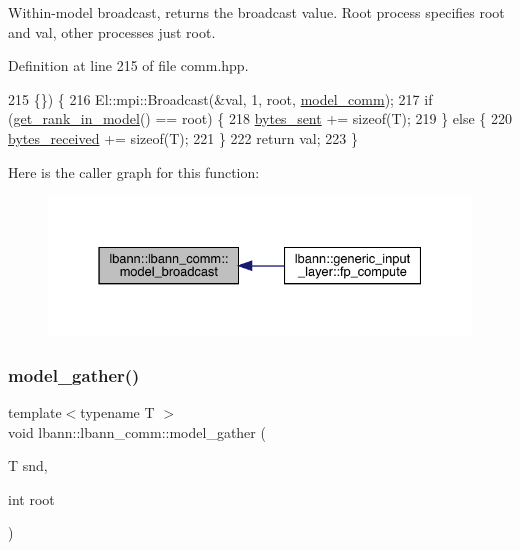 Within-\/model broadcast, returns the broadcast value. Root process specifies root and val, other processes just root. 

Definition at line 215 of file comm.\+hpp.


\begin{DoxyCode}
215                                       \{\}) \{
216     El::mpi::Broadcast(&val, 1, root, \hyperlink{classlbann_1_1lbann__comm_a58a75b76bd61ec8a26c1cbbec3dc2f45}{model\_comm});
217     \textcolor{keywordflow}{if} (\hyperlink{classlbann_1_1lbann__comm_a789453454468a3b70de768537c50ca52}{get\_rank\_in\_model}() == root) \{
218       \hyperlink{classlbann_1_1lbann__comm_ad1f146ae7337ece6266fd307944928e0}{bytes\_sent} += \textcolor{keyword}{sizeof}(T);
219     \} \textcolor{keywordflow}{else} \{
220       \hyperlink{classlbann_1_1lbann__comm_afb99f57f7eafc0695bf28e6c26a8120f}{bytes\_received} += \textcolor{keyword}{sizeof}(T);
221     \}
222     \textcolor{keywordflow}{return} val;
223   \}
\end{DoxyCode}
Here is the caller graph for this function\+:\nopagebreak
\begin{figure}[H]
\begin{center}
\leavevmode
\includegraphics[width=331pt]{classlbann_1_1lbann__comm_a929f44a9a9563ae9e4ffe7d44235a195_icgraph}
\end{center}
\end{figure}
\mbox{\label{classlbann_1_1lbann__comm_ab7cdeca37f1fcd22a3b69f6134fb299f}} 
\subsubsection{\texorpdfstring{model\+\_\+gather()}{model\_gather()}\hspace{0.1cm}{\footnotesize\ttfamily [1/4]}}
{\footnotesize\ttfamily template$<$typename T $>$ \\
void lbann\+::lbann\+\_\+comm\+::model\+\_\+gather (\begin{DoxyParamCaption}\item[{T}]{snd,  }\item[{int}]{root }\end{DoxyParamCaption})\hspace{0.3cm}{\ttfamily [inline]}}

